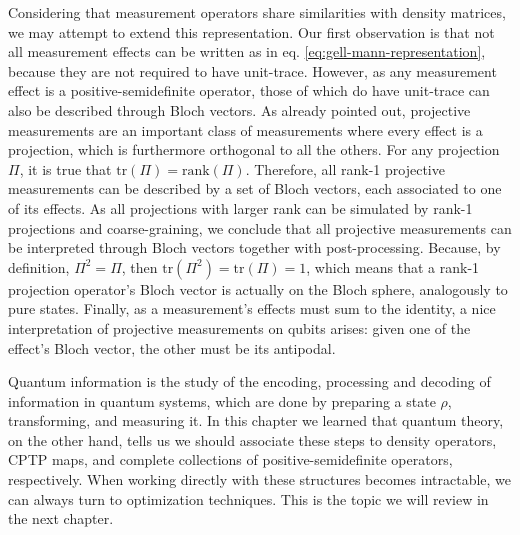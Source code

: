 		Considering that measurement operators share similarities with density matrices, we may attempt to extend this representation. Our first observation is that not all measurement effects can be written as in eq. \ref{eq:gell-mann-representation}, because they are not required to have unit-trace. However, as any measurement effect is a positive-semidefinite operator, those of which do have unit-trace can also be described through Bloch vectors. As already pointed out, projective measurements are an important class of measurements where every effect is a projection, which is furthermore orthogonal to all the others. For any projection $\Pi$, it is true that $\text{tr}(\Pi) = \text{rank}(\Pi)$. Therefore, all rank-1 projective measurements can be described by a set of Bloch vectors, each associated to one of its effects. As all projections with larger rank can be simulated by rank-1 projections and coarse-graining, we conclude that all projective measurements can be interpreted through Bloch vectors together with post-processing. Because, by definition, $\Pi^2 = \Pi$, then $\text{tr}(\Pi^2) = \text{tr}(\Pi) = 1$, which means that a rank-1 projection operator's Bloch vector is actually on the Bloch sphere, analogously to pure states. Finally, as a measurement's effects must sum to the identity, a nice interpretation of projective measurements on qubits arises: given one of the effect's Bloch vector, the other must be its antipodal.


		\ornamentbreak
		Quantum information is the study of the encoding, processing and decoding of information in quantum systems, which are done by preparing a state $\rho$, transforming, and measuring it. In this chapter we learned that quantum theory, on the other hand, tells us we should associate these steps to density operators, CPTP maps, and complete collections of positive-semidefinite operators, respectively. When working directly with these structures becomes intractable, we can always turn to optimization techniques. This is the topic we will review in the next chapter.